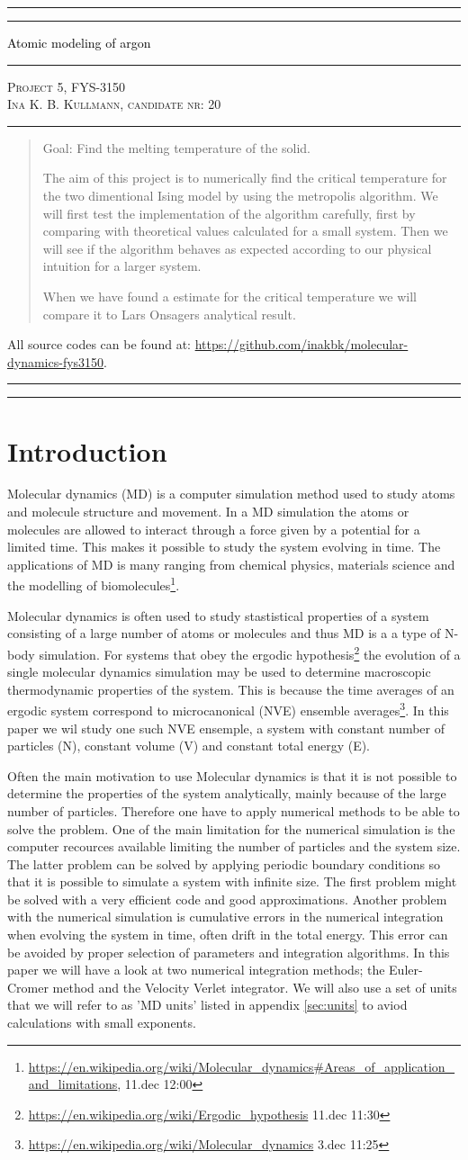 \documentclass[11pt,a4wide]{article}
\newcommand*{\titleAT}{\begingroup %
\newlength{\drop} %
\drop=0.1\textheight %

\rule{\textwidth}{1pt}\par %
\vspace{2pt}\vspace{-\baselineskip} %
\rule{\textwidth}{0.4pt}\par %

\vspace{0.5\drop} %
\centering %
\textcolor{black}{ %
{\Huge Atomic modeling of argon}\\[0.75\baselineskip] %
} 

\vspace{0.25\drop} %
\rule{0.3\textwidth}{0.4pt}\par %
\vspace{0.25\drop} %

{\Large \textsc{Project 5, FYS-3150\\[0.75\baselineskip] \normalsize{Ina K. B. Kullmann, candidate nr: 20}
}}\par %


\vspace{0.25\drop} %
\rule{0.3\textwidth}{0.4pt}\par %
\vspace{0.25\drop} %

\begin{abstract}
Goal: Find the melting temperature of the solid.

The aim of this project is to numerically find the critical temperature for the two dimentional Ising model by using the metropolis algorithm. We will first test the implementation of the algorithm carefully, first by comparing with theoretical values calculated for a small system. Then we will see if the algorithm behaves as expected according to our physical intuition for a larger system.

When we have found a estimate for the critical temperature we will compare it to Lars Onsagers analytical result.

\end{abstract}
\vspace*{0.25\drop} %

\begin{center}
{ \scriptsize \noindent All source codes can be found at: \url{https://github.com/inakbk/molecular-dynamics-fys3150}. }
\end{center}

\rule{\textwidth}{0.4pt}\par %
\vspace{2pt}\vspace{-\baselineskip} %
\rule{\textwidth}{1pt}\par %

\endgroup}
\begin{document}
\titleAT %


\newpage
\tableofcontents
\newpage

\section{Introduction}

Molecular dynamics (MD) is a computer simulation method used to study atoms and molecule structure and movement. In a MD simulation the atoms or molecules are allowed to interact through a force given by a potential for a limited time. This makes it possible to study the system evolving in time. The applications of MD is many ranging from chemical physics, materials science and the modelling of biomolecules\footnote{\url{https://en.wikipedia.org/wiki/Molecular\_dynamics\#Areas\_of\_application\_and\_limitations}, 11.dec 12:00}.

Molecular dynamics is often used to study stastistical properties of a system consisting of a large number of atoms or molecules and thus MD is a a type of N-body simulation. For systems that obey the ergodic hypothesis\footnote{\url{https://en.wikipedia.org/wiki/Ergodic\_hypothesis} 11.dec 11:30} the evolution of a single molecular dynamics simulation may be used to determine macroscopic thermodynamic properties of the system. This is because the time averages of an ergodic system correspond to microcanonical (NVE) ensemble averages\footnote{\url{https://en.wikipedia.org/wiki/Molecular\_dynamics} 3.dec 11:25}. In this paper we wil study one such NVE ensemple, a system with constant number of particles (N), constant volume (V) and constant total energy (E). 

Often the main motivation to use Molecular dynamics is that it is not possible to determine the properties of the system analytically, mainly because of the large number of particles. Therefore one have to apply numerical methods to be able to solve the problem. One of the main limitation for the numerical simulation is the computer recources available limiting the number of particles and the system size. The latter problem can be solved by applying periodic boundary conditions so that it is possible to simulate a system with infinite size. The first problem might be solved with a very efficient code and good approximations. Another problem with the numerical simulation is cumulative errors in the numerical integration when evolving the system in time, often drift in the total energy. This error can be avoided by proper selection of parameters and integration algorithms. In this paper we will have a look at two numerical integration methods; the Euler-Cromer method and the Velocity Verlet integrator. We will also use a set of units that we will refer to as 'MD units' listed in appendix \ref{sec:units} to aviod calculations with small exponents.
\end{document}
